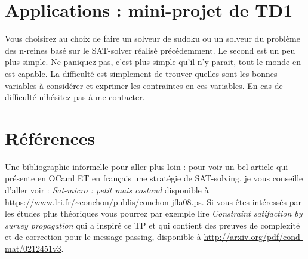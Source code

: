 \documentclass[10pt,a4paper]{article}
\begin{document}
\section{Applications : mini-projet de TD1}

Vous choisirez au choix de faire un solveur de sudoku ou un solveur du problème des n-reines basé sur le SAT-solver réalisé précédemment. Le second est un peu plus simple. Ne paniquez pas, c'est plus simple qu'il n'y parait, tout le monde en est capable. La difficulté est simplement de trouver quelles sont les bonnes variables à considérer et exprimer les contraintes en ces variables. En cas de difficulté n'hésitez pas à me contacter.



\section{Références}
Une bibliographie informelle pour aller plus loin : 
pour voir un bel article qui présente en OCaml ET en français une stratégie de SAT-solving, je vous conseille d'aller voir : \emph{Sat-micro : petit mais costaud} disponible à \url{https://www.lri.fr/~conchon/publis/conchon-jfla08.ps}.
Si vous êtes intéressés par les études plus théoriques vous pourrez par exemple lire \emph{Constraint satifaction by survey propagation} qui a inspiré ce TP et qui contient des preuves de complexité et de correction pour le message passing, disponible à \url{http://arxiv.org/pdf/cond-mat/0212451v3}.
\end{document}
